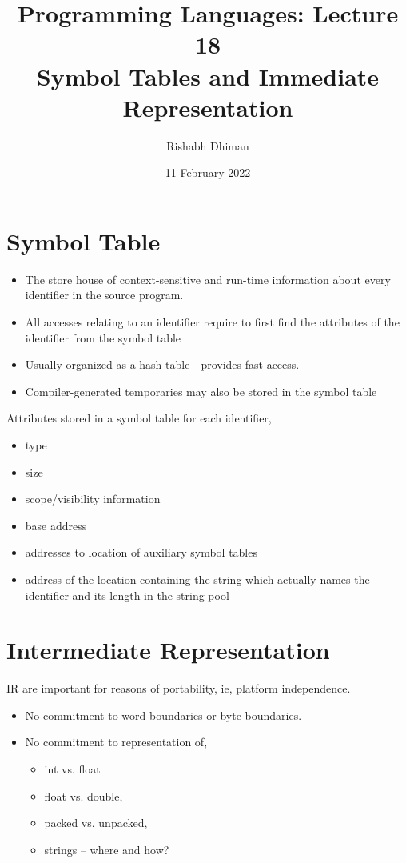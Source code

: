\documentclass[a4paper]{scrartcl}
\title{
	Programming Languages: Lecture 18\\
	Symbol Tables and Immediate Representation
}
\author{Rishabh Dhiman}
\date{11 February 2022}
\theoremstyle{definition}
\begin{document}
\maketitle

\section{Symbol Table}
\begin{itemize}
	\item The store house of context-sensitive and run-time information about every
identifier in the source program.
	\item All accesses relating to an identifier require to first find the attributes of the
identifier from the symbol table
	\item Usually organized as a hash table - provides fast access.
	\item Compiler-generated temporaries may also be stored in the symbol table
\end{itemize}

Attributes stored in a symbol table for each identifier,
\begin{itemize}
	\item type
	\item size
	\item scope/visibility information
	\item base address
	\item addresses to location of auxiliary symbol tables
	\item address of the location containing the string which actually names the identifier and its length in the string pool
\end{itemize}

\section{Intermediate Representation}
IR are important for reasons of portability, ie, platform independence.

\begin{itemize}
	\item No commitment to word boundaries or byte boundaries.
	\item No commitment to representation of,
		\begin{itemize}
			\item int vs. float
			\item float vs. double,
			\item packed vs. unpacked,
			\item strings -- where and how?
		\end{itemize}
\end{itemize}
\end{document}
